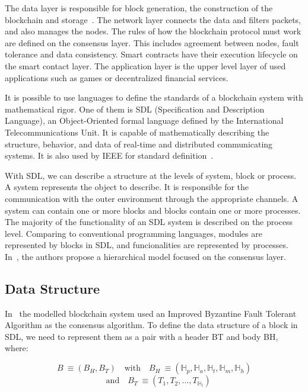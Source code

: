 \documentclass[sigconf, nonacm]{acmart}
\begin{document}
The data layer is responsible for block generation, the construction of the blockchain and storage~\cite{Duan2018}. 
The network layer connects the data and filters packets, and also manages the nodes. 
The rules of how the blockchain protocol must work are defined on the consensus layer. 
This includes agreement between nodes, fault tolerance and data consistency. 
Smart contracts have their execution lifecycle on the smart contact layer.
The application layer is the upper level layer of used applications such as games or decentralized financial services. 

It is possible to use languages to define the standards of a blockchain system with mathematical rigor.
One of them is SDL (Specification and Description Language), an Object-Oriented formal language defined by the International Telecommunications Unit.
It is capable of mathematically describing the structure, behavior, and data of real-time and distributed communicating systems. 
It is also used by IEEE for standard definition~\cite{Duan2018}.

With SDL, we can describe a structure at the levels of system, block or process. A system represents the object to describe. 
It is responsible for the communication with the outer environment through the appropriate channels.
A system can contain one or more blocks and blocks contain one or more processes.
The majority of the functionality of an SDL system is described on the process level.
Comparing to conventional programming languages, modules are represented by blocks in SDL, and funcionalities are represented by processes.
In~\cite{Duan2018}, the authors propose a hierarchical model focused on the consensus layer.

  \subsection{Data Structure}
  In~\cite{Duan2018} the modelled blockchain system used an Improved Byzantine Fault Tolerant Algorithm as the consensus algorithm.
  To define the data structure of a block in SDL, we need to represent them as a pair with a header BT and body BH, where:

  \begin{displaymath}
    B~\equiv(B_H,B_T) \quad \textrm{with} \quad B_H~\equiv(\mathbb{H}_p,\mathbb{H}_a,\mathbb{H}_t,\mathbb{H}_m,\mathbb{H}_h) 
  \end{displaymath}
  \begin{displaymath}
    \quad \textrm{and} \quad B_T~\equiv(T_1,T_2,...,T_{\mathbb{H}_l}) 
  \end{displaymath}
  \linebreak[1]
\end{document}
